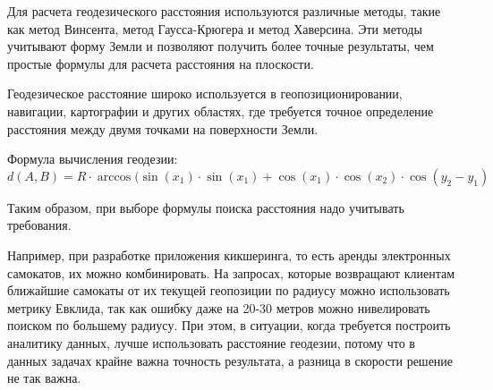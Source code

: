Для расчета геодезического расстояния используются различные методы, такие как метод Винсента, метод Гаусса-Крюгера и метод Хаверсина. Эти методы учитывают форму Земли и позволяют получить более точные результаты, чем простые формулы для расчета расстояния на плоскости.
    
Геодезическое расстояние широко используется в геопозиционировании, навигации, картографии и других областях, где требуется точное определение расстояния между двумя точками на поверхности Земли.

Формула вычисления геодезии:
$$
d(A, B) = R \cdot \arccos(\sin(x_1) \cdot \sin(x_1) + \cos(x_1) \cdot \cos(x_2) \cdot \cos(y_2 - y_1)
$$

Таким образом, при выборе формулы поиска расстояния надо учитывать требования.

Например, при разработке приложения кикшеринга, то есть аренды электронных самокатов, их можно комбинировать. На запросах, которые возвращают клиентам ближайшие самокаты от их текущей геопозиции по радиусу можно использовать метрику Евклида, так как ошибку даже на 20-30 метров можно нивелировать поиском по большему радиусу.  
При этом, в ситуации, когда требуется построить аналитику данных, лучше использовать расстояние геодезии, потому что в данных задачах крайне важна точность результата, а разница в скорости решение не так важна. 
